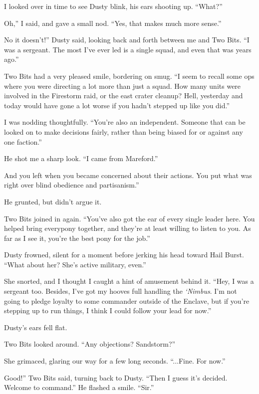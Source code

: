 I looked over in time to see Dusty blink, his ears shooting up. “What?”

\leavevmode{}Oh,” I said, and gave a small nod. “Yes, that makes much more sense.”

\leavevmode{}No it doesn’t!” Dusty said, looking back and forth between me and Two Bits. “I was a sergeant. The most I’ve ever led is a single squad, and even that was years ago.”

Two Bits had a very pleased smile, bordering on smug. “I seem to recall some ops where you were directing a lot more than just a squad. How many units were involved in the Firestorm raid, or the east crater cleanup? Hell, yesterday and today would have gone a lot worse if you hadn’t stepped up like you did.”

I was nodding thoughtfully. “You’re also an independent. Someone that can be looked on to make decisions fairly, rather than being biased for or against any one faction.”

He shot me a sharp look. “I came from Mareford.”

\leavevmode{}And you left when you became concerned about their actions. You put what was right over blind obedience and partisanism.”

He grunted, but didn’t argue it.

Two Bits joined in again. “You’ve also got the ear of every single leader here. You helped bring everypony together, and they’re at least willing to listen to you. As far as I see it, you’re the best pony for the job.”

Dusty frowned, silent for a moment before jerking his head toward Hail Burst. “What about her? She’s active military, even.”

She snorted, and I thought I caught a hint of amusement behind it. “Hey, I was a sergeant too. Besides, I’ve got my hooves full handling the \textit{‘Nimbus}. I’m not going to pledge loyalty to some commander outside of the Enclave, but if you’re stepping up to run things, I think I could follow your lead for now.”

Dusty’s ears fell flat.

Two Bits looked around. “Any objections? Sandstorm?”

She grimaced, glaring our way for a few long seconds. “...Fine. For now.”

\leavevmode{}Good!” Two Bits said, turning back to Dusty. “Then I guess it’s decided. Welcome to command.” He flashed a smile. “Sir.”

